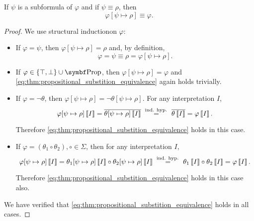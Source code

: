 \begin{proposition}\label{thm:propositional_substition_equivalence}
  If \( \psi \) is a subformula of \( \varphi \) and if \( \psi \equiv \rho \), then
  \begin{equation}\label{eq:thm:propositional_substition_equivalence}
    \varphi[\psi \mapsto \rho] \equiv \varphi.
  \end{equation}
\end{proposition}
\begin{proof}
  We use structural induction\IND on \( \varphi \):

  \begin{itemize}
    \item If \( \varphi = \psi \), then \( \varphi[\psi \mapsto \rho] = \rho \) and, by definition,
    \begin{equation*}
      \varphi = \psi \equiv \rho = \varphi[\psi \mapsto \rho].
    \end{equation*}

    \item If \( \varphi \in \{ \top, \bot \} \cup \Bold{Prop} \), then \( \varphi[\psi \mapsto \rho] = \varphi \) and \eqref{eq:thm:propositional_substition_equivalence} again holds trivially.

    \item If \( \varphi = \neg \theta \), then \( \varphi[\psi \mapsto \rho] = \neg \theta[\psi \mapsto \rho] \). For any interpretation \( I \),
    \begin{equation*}
      \varphi[\psi \mapsto \rho]\left\llbracket I \right\rrbracket
      =
      \overline{\theta[\psi \mapsto \rho]\left\llbracket I \right\rrbracket}
      \overset {\text{ ind. hyp. }} =
      \overline{\theta\left\llbracket I \right\rrbracket}
      =
      \varphi\left\llbracket I \right\rrbracket.
    \end{equation*}

    Therefore \eqref{eq:thm:propositional_substition_equivalence} holds in this case.

    \item If \( \varphi = (\theta_1 \circ \theta_2), \circ \in \Sigma \), then for any interpretation \( I \),
    \begin{equation*}
      \varphi[\psi \mapsto \rho]\left\llbracket I \right\rrbracket
      =
      \theta_1[\psi \mapsto \rho]\left\llbracket I \right\rrbracket \circ \theta_2[\psi \mapsto \rho]\left\llbracket I \right\rrbracket
      \overset {\text{ ind. hyp. }} =
      \theta_1\left\llbracket I \right\rrbracket \circ \theta_2\left\llbracket I \right\rrbracket
      =
      \varphi\left\llbracket I \right\rrbracket.
    \end{equation*}

    Therefore \eqref{eq:thm:propositional_substition_equivalence} holds in this case also.
  \end{itemize}

  We have verified that \eqref{eq:thm:propositional_substition_equivalence} holds in all cases.
\end{proof}

